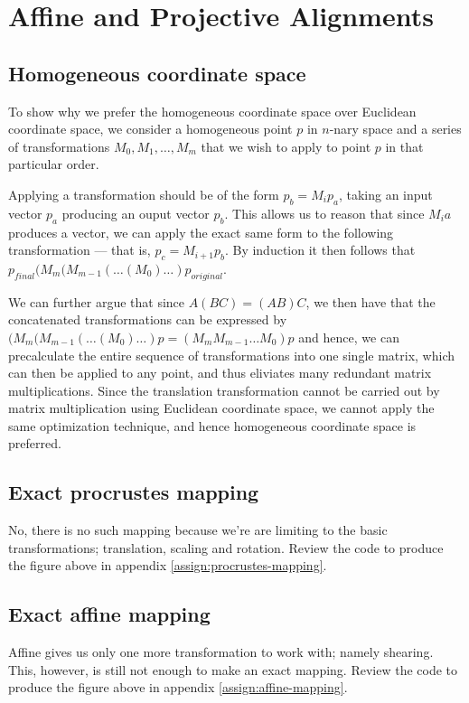 %
%

\setcounter{section}{3}
\section{Affine and Projective Alignments}

\subsection{Homogeneous coordinate space}
To show why we prefer the homogeneous coordinate space over Euclidean
coordinate space, we consider a homogeneous point $p$ in $n$-nary space and a
series of transformations $M_0, M_1, \dots,M_m$ that we wish to apply to point
$p$ in that particular order.

Applying a transformation should be of the form $p_b = M_{i}p_a$, taking an
input vector $p_a$ producing an ouput vector $p_b$. This allows us to reason
that since $M_{i}a$ produces a vector, we can apply the exact same form to the
following transformation --- that is, $p_c = M_{i+1}p_b$. By induction it then
follows that $p_{final}(M_m(M_{m-1}(\dots(M_0)\dots)p_{original}$.

We can further argue that since $A(BC) = (AB)C$, we then have that the
concatenated transformations can be expressed by
$(M_m(M_{m-1}(\dots(M_0)\dots)p = (M_{m}M_{m-1} \dots M_{0})p$ and hence, we
can precalculate the entire sequence of transformations into one single
matrix, which can then be applied to any point, and thus eliviates many
redundant matrix multiplications. Since the translation transformation cannot
be carried out by matrix multiplication using Euclidean coordinate space, we
cannot apply the same optimization technique, and hence homogeneous coordinate
space is preferred.

\begin{multicols}{2}
    \subsection{Exact procrustes mapping}
    No, there is no such mapping because we're are limiting to the basic
    transformations; translation, scaling and rotation.
    Review the code to produce the figure above in appendix
    \ref{assign:procrustes-mapping}.

    \vfill\columnbreak

    \subsection{Exact affine mapping}
    Affine gives us only one more transformation to work with; namely shearing.
    This, however, is still not enough to make an exact mapping.
    Review the code to produce the figure above in appendix
    \ref{assign:affine-mapping}.
\end{multicols}

